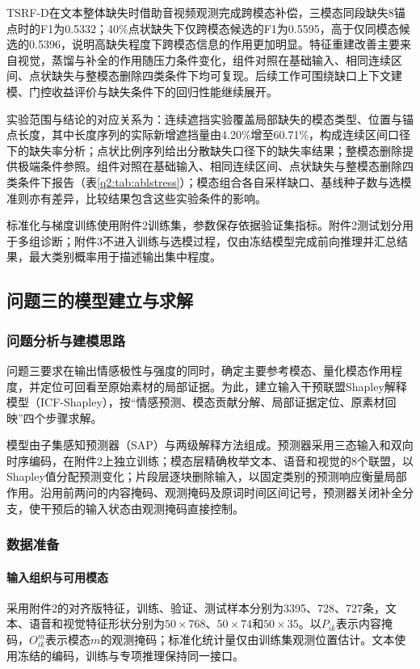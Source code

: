 TSRF-D在文本整体缺失时借助音视频观测完成跨模态补偿，三模态同段缺失8锚点时的F1为0.5332；40\%点状缺失下仅跨模态候选的F1为0.5595，高于仅同模态候选的0.5396，说明高缺失程度下跨模态信息的作用更加明显。特征重建改善主要来自视觉，蒸馏与补全的作用随压力条件变化，组件对照在基础输入、相同连续区间、点状缺失与整模态删除四类条件下均可复现。后续工作可围绕缺口上下文建模、门控收益评价与缺失条件下的回归性能继续展开。

实验范围与结论的对应关系为：连续遮挡实验覆盖局部缺失的模态类型、位置与锚点长度，其中长度序列的实际新增遮挡量由4.20\%增至60.71\%，构成连续区间口径下的缺失率分析；点状比例序列给出分散缺失口径下的缺失率结果；整模态删除提供极端条件参照。组件对照在基础输入、相同连续区间、点状缺失与整模态删除四类条件下报告（表\ref{q2:tab:ablstress}）；模态组合各自采样缺口、基线种子数与选模准则亦有差异，比较结果包含这些实验条件的影响。

标准化与梯度训练使用附件2训练集，参数保存依据验证集指标。附件2测试划分用于多组诊断；附件3不进入训练与选模过程，仅由冻结模型完成前向推理并汇总结果，最大类别概率用于描述输出集中程度。


\subsection{问题三的模型建立与求解}
\label{sec:q3}
\subsubsection{问题分析与建模思路}
问题三要求在输出情感极性与强度的同时，确定主要参考模态、量化模态作用程度，并定位可回看至原始素材的局部证据。为此，建立输入干预联盟Shapley解释模型（ICF-Shapley），按“情感预测、模态贡献分解、局部证据定位、原素材回映”四个步骤求解。

模型由子集感知预测器（SAP）与两级解释方法组成。预测器采用三态输入和双向时序编码，在附件2上独立训练；模态层精确枚举文本、语音和视觉的8个联盟，以Shapley值分配预测变化；片段层逐块删除输入，以固定类别的预测响应衡量局部作用。沿用前两问的内容掩码、观测掩码及原词时间区间记号，预测器关闭补全分支，使干预后的输入状态由观测掩码直接控制。

\subsubsection{数据准备}
\paragraph{输入组织与可用模态}
采用附件2的对齐版特征，训练、验证、测试样本分别为3395、728、727条，文本、语音和视觉特征形状分别为$50\times768$、$50\times74$和$50\times35$。以$P_{ik}$表示内容掩码，$O^m_{ik}$表示模态$m$的观测掩码；标准化统计量仅由训练集观测位置估计。文本使用冻结的编码，训练与专项推理保持同一接口。

